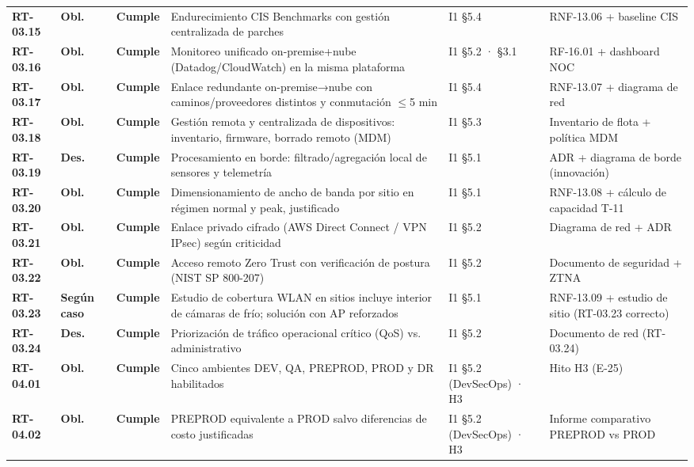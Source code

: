 \begin{small}
\begin{longtable}{@{}p{1.35cm} p{1.15cm} p{1.15cm} p{4.6cm} p{2.35cm} p{3.8cm}@{}}
\textbf{RT-03.15} & \textbf{Obl.} & \textbf{Cumple} & Endurecimiento CIS Benchmarks con gesti\'on centralizada de parches & I1 §5.4 & RNF-13.06 + baseline CIS \\
\textbf{RT-03.16} & \textbf{Obl.} & \textbf{Cumple} & Monitoreo unificado on-premise+nube (Datadog/CloudWatch) en la misma plataforma & I1 §5.2 · §3.1 & RF-16.01 + dashboard NOC \\
\textbf{RT-03.17} & \textbf{Obl.} & \textbf{Cumple} & Enlace redundante on-premise→nube con caminos/proveedores distintos y conmutaci\'on $\leq$5 min & I1 §5.4 & RNF-13.07 + diagrama de red \\
\textbf{RT-03.18} & \textbf{Obl.} & \textbf{Cumple} & Gesti\'on remota y centralizada de dispositivos: inventario, firmware, borrado remoto (MDM) & I1 §5.3 & Inventario de flota + pol\'itica MDM \\
\textbf{RT-03.19} & \textbf{Des.} & \textbf{Cumple} & Procesamiento en borde: filtrado/agregaci\'on local de sensores y telemetr\'ia & I1 §5.1 & ADR + diagrama de borde (innovaci\'on) \\
\textbf{RT-03.20} & \textbf{Obl.} & \textbf{Cumple} & Dimensionamiento de ancho de banda por sitio en r\'egimen normal y peak, justificado & I1 §5.1 & RNF-13.08 + c\'alculo de capacidad T-11 \\
\textbf{RT-03.21} & \textbf{Obl.} & \textbf{Cumple} & Enlace privado cifrado (AWS Direct Connect / VPN IPsec) seg\'un criticidad & I1 §5.2 & Diagrama de red + ADR \\
\textbf{RT-03.22} & \textbf{Obl.} & \textbf{Cumple} & Acceso remoto Zero Trust con verificaci\'on de postura (NIST SP 800-207) & I1 §5.2 & Documento de seguridad + ZTNA \\
\textbf{RT-03.23} & \textbf{Según caso} & \textbf{Cumple} & Estudio de cobertura WLAN en sitios incluye interior de c\'amaras de fr\'io; soluci\'on con AP reforzados & I1 §5.1 & RNF-13.09 + estudio de sitio (RT-03.23 correcto) \\
\textbf{RT-03.24} & \textbf{Des.} & \textbf{Cumple} & Priorizaci\'on de tr\'afico operacional cr\'itico (QoS) vs. administrativo & I1 §5.2 & Documento de red (RT-03.24) \\
\textbf{RT-04.01} & \textbf{Obl.} & \textbf{Cumple} & Cinco ambientes DEV, QA, PREPROD, PROD y DR habilitados & I1 §5.2 (DevSecOps) · H3 & Hito H3 (E-25) \\
\textbf{RT-04.02} & \textbf{Obl.} & \textbf{Cumple} & PREPROD equivalente a PROD salvo diferencias de costo justificadas & I1 §5.2 (DevSecOps) · H3 & Informe comparativo PREPROD vs PROD \\

\end{longtable}
\end{small}
